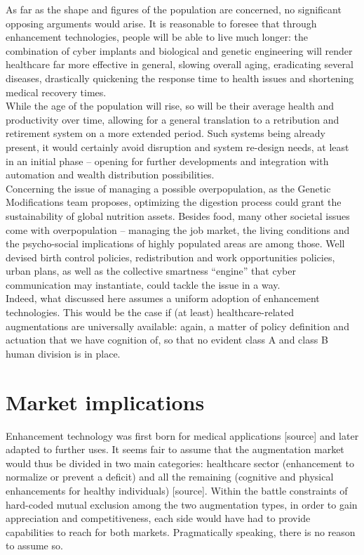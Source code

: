 As far as the shape and figures of the population are concerned, no significant opposing arguments would arise. It is reasonable to foresee that through enhancement technologies, people will be able to live much longer: the combination of cyber implants and biological and genetic engineering will render healthcare far more effective in general, slowing overall aging, eradicating several diseases, drastically quickening the response time to health issues and shortening medical recovery times.\\

While the age of the population will rise, so will be their average health and productivity over time, allowing for a general translation to a retribution and retirement system on a more extended period. Such systems being already present, it would certainly avoid disruption and system re-design needs, at least in an initial phase – opening for further developments and integration with automation and wealth distribution possibilities.\\

Concerning the issue of managing a possible overpopulation, as the Genetic Modifications team proposes, optimizing the digestion process could grant the sustainability of global nutrition assets. Besides food, many other societal issues come with overpopulation – managing the job market, the living conditions and the psycho-social implications of highly populated areas are among those. Well devised birth control policies, redistribution and work opportunities policies, urban plans, as well as the collective smartness “engine” that cyber communication may instantiate, could tackle the issue in a way.\\

Indeed, what discussed here assumes a uniform adoption of enhancement technologies. This would be the case if (at least) healthcare-related augmentations are universally available: again, a matter of policy definition and actuation that we have cognition of, so that no evident class A and class B human division is in place.

\section*{Market implications}
\label{sec:market}

Enhancement technology was first born for medical applications [source] and later adapted to further uses. It seems fair to assume that the augmentation market would thus be divided in two main categories: healthcare sector (enhancement to normalize or prevent a deficit) and all the remaining (cognitive and physical enhancements for healthy individuals) [source]. Within the battle constraints of hard-coded mutual exclusion among the two augmentation types, in order to gain appreciation and competitiveness, each side would have had to provide capabilities to reach for both markets. Pragmatically speaking, there is no reason to assume so.\\

